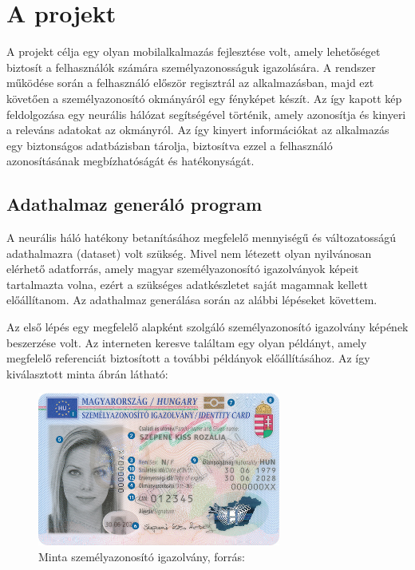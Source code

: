 \documentclass[
]{thesis-ekf}
\theoremstyle{definition}
\theoremstyle{remark}
\begin{document}
\chapter{A projekt}

A projekt célja egy olyan mobilalkalmazás fejlesztése volt, amely lehetőséget biztosít a felhasználók számára személyazonosságuk igazolására. A rendszer működése során a felhasználó először regisztrál az alkalmazásban, majd ezt követően a személyazonosító okmányáról egy fényképet készít. Az így kapott kép feldolgozása egy neurális hálózat segítségével történik, amely azonosítja és kinyeri a releváns adatokat az okmányról. Az így kinyert információkat az alkalmazás egy biztonságos adatbázisban tárolja, biztosítva ezzel a felhasználó azonosításának megbízhatóságát és hatékonyságát.

\section{Adathalmaz generáló program}

A neurális háló hatékony betanításához megfelelő mennyiségű és változatosságú adathalmazra (dataset) volt szükség. Mivel nem létezett olyan nyilvánosan elérhető adatforrás, amely magyar személyazonosító igazolványok képeit tartalmazta volna, ezért a szükséges adatkészletet saját magamnak kellett előállítanom. Az adathalmaz generálása során az alábbi lépéseket követtem.

Az első lépés egy megfelelő alapként szolgáló személyazonosító igazolvány képének beszerzése volt. Az interneten keresve találtam egy olyan példányt, amely megfelelő referenciát biztosított a további példányok előállításához. Az így kiválasztott minta  ábrán látható:

\FloatBarrier
\begin{figure}[H]
	\centering
	\includegraphics[width=8cm]{eszemelyi-front}
	\caption{Minta személyazonosító igazolvány, forrás: \cite{eszemelyiImage} }
	\label{fig-eszemelyi}
\end{figure}
\end{document}
